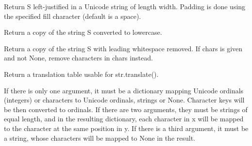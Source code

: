\documentclass[letterpaper,10pt,english]{sphinxmanual}
\begin{document}
\begin{fulllineitems}

\begin{fulllineitems}
\label{api_reference:textblob_de.blob.Word.ljust}
Return S left-justified in a Unicode string of length width. Padding is
done using the specified fill character (default is a space).

\end{fulllineitems}


\begin{fulllineitems}
\label{api_reference:textblob_de.blob.Word.lower}
Return a copy of the string S converted to lowercase.

\end{fulllineitems}


\begin{fulllineitems}
\label{api_reference:textblob_de.blob.Word.lstrip}
Return a copy of the string S with leading whitespace removed.
If chars is given and not None, remove characters in chars instead.

\end{fulllineitems}


\begin{fulllineitems}
\label{api_reference:textblob_de.blob.Word.maketrans}
Return a translation table usable for str.translate().

If there is only one argument, it must be a dictionary mapping Unicode
ordinals (integers) or characters to Unicode ordinals, strings or None.
Character keys will be then converted to ordinals.
If there are two arguments, they must be strings of equal length, and
in the resulting dictionary, each character in x will be mapped to the
character at the same position in y. If there is a third argument, it
must be a string, whose characters will be mapped to None in the result.

\end{fulllineitems}


\end{fulllineitems}
\end{document}
